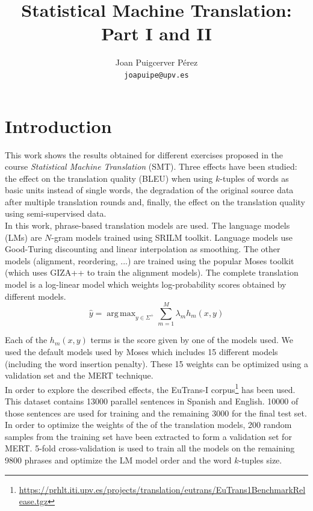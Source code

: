 \documentclass[10pt,a4paper]{article}
\author{Joan Puigcerver Pérez\\
\footnotesize{\texttt{joapuipe@upv.es}}}
\title{Statistical Machine Translation: Part I and II}
\DeclareMathOperator*{\argmax}{arg\,max}
\begin{document}
\maketitle
\section{Introduction}\label{sec:intro}
This work shows the results obtained for different exercises proposed in the course \emph{Statistical Machine Translation} (SMT). Three effects have been studied: the effect on the translation quality (BLEU) when using $k$-tuples of words as basic units instead of single words, the degradation of the original source data after multiple translation rounds and, finally, the effect on the translation quality using semi-supervised data.\\

In this work, phrase-based translation models are used. The language models (LMs) are $N$-gram models trained using SRILM toolkit. Language models use Good-Turing discounting and linear interpolation as smoothing. The other models (alignment, reordering, ...) are trained using the popular Moses toolkit (which uses GIZA++ to train the alignment models). The complete translation model is a log-linear model which weights log-probability scores obtained by different models.\\

\begin{equation}
\hat{y} = \argmax_{y \in \Sigma^+} \sum_{m=1}^M \lambda_m h_m(x, y)
\end{equation}

Each of the $h_m(x,y)$ terms is the score given by one of the models used. We used the default models used by Moses which includes 15 different models (including the word insertion penalty). These 15 weights can be optimized using a validation set and the MERT technique.\\

In order to explore the described effects, the EuTrans-I corpus\footnote{\url{https://prhlt.iti.upv.es/projects/translation/eutrans/EuTrans1BenchmarkRelease.tgz}} has been used. This dataset contains 13000 parallel sentences in Spanish and English. 10000 of those sentences are used for training and the remaining 3000 for the final test set. In order to optimize the weights of the of the translation models, 200 random samples from the training set have been extracted to form a validation set for MERT. 5-fold cross-validation is used to train all the models on the remaining 9800 phrases and optimize the LM model order and the word $k$-tuples size.\\
\end{document}
